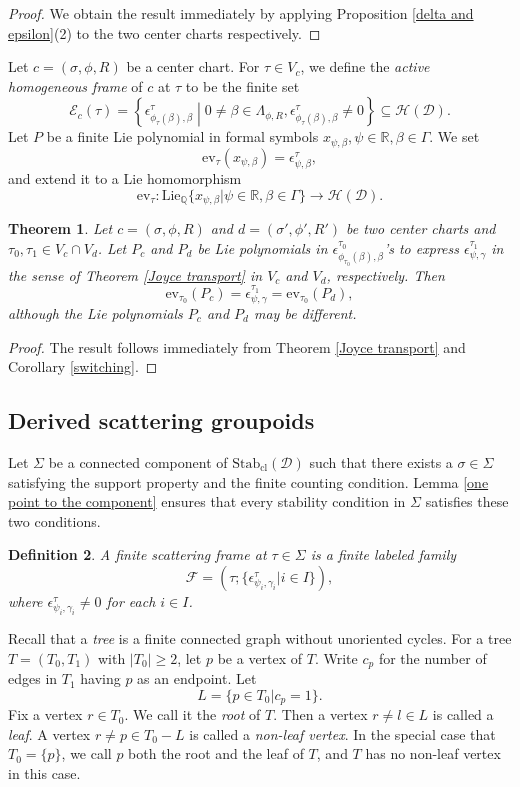 \documentclass[a4paper,12pt]{amsart}
\numberwithin{equation}{section}
\newtheorem{theorem}{Theorem}[section]
\newtheorem{definition}[theorem]{Definition}
\newcommand{\Stab}{\mathrm{Stab}}
\newcommand{\cl}{\mathrm{cl}}
\newcommand{\1}{\mathbf{1}}
\newcommand{\ev}{\mathrm{ev}}
\newcommand{\Lie}{\mathrm{Lie}}
\begin{document}
\begin{proof}
    We obtain the result immediately by applying Proposition \ref{delta and epsilon}(2) to the two center charts respectively.
\end{proof}
Let $c=(\sigma,\phi,R)$ be a center chart. For $\tau\in V_c$, we define the \emph{active homogeneous frame} of $c$ at $\tau$ to be the finite set
\[\mathscr{E}_c(\tau)=\left\{\epsilon^\tau_{\phi_\tau(\beta),\beta}\middle|0\neq\beta\in\Lambda_{\phi,R},\epsilon^\tau_{\phi_\tau(\beta),\beta}\neq0\right\}\subseteq\mathcal{H}(\mathcal{D}).\]
Let $P$ be a finite Lie polynomial in formal symbols $x_{\psi,\beta},\psi\in\mathbb{R},\beta\in\Gamma$. We set
\[\ev_\tau(x_{\psi,\beta})=\epsilon^\tau_{\psi,\beta},\]
and extend it to a Lie homomorphism
\[\ev_\tau:\Lie_{\mathbb{Q}}\{x_{\psi,\beta}|\psi\in\mathbb{R},\beta\in\Gamma\}\rightarrow\mathcal{H}(\mathcal{D}).\]


\begin{theorem}
    Let $c=(\sigma,\phi,R)$ and $d=(\sigma',\phi',R')$ be two center charts and $\tau_0,\tau_1\in V_c\cap V_d$. Let $P_c$ and $P_d$ be Lie polynomials in $\epsilon^{\tau_0}_{\phi_{\tau_0}(\beta),\beta}$'s to express $\epsilon^{\tau_1}_{\psi,\gamma}$ in the sense of Theorem \ref{Joyce transport} in $V_c$ and $V_d$, respectively. Then
    \[\ev_{\tau_0}(P_c)=\epsilon^{\tau_1}_{\psi,\gamma}=\ev_{\tau_0}(P_d),\]
    although the Lie polynomials $P_c$ and $P_d$ may be different.
\end{theorem}
\begin{proof}
    The result follows immediately from Theorem \ref{Joyce transport} and Corollary \ref{switching}.
\end{proof}
\subsection{Derived scattering groupoids}
Let $\Sigma$ be a connected component of $\Stab_\cl(\mathcal{D})$ such that there exists a $\sigma\in\Sigma$ satisfying the support property and the finite counting condition. Lemma \ref{one point to the component} ensures that every stability condition in $\Sigma$ satisfies these two conditions.
\begin{definition}
    A \emph{finite scattering frame} at $\tau\in\Sigma$ is a finite labeled family
    \[\mathscr{F}=\left(\tau;\{\epsilon^\tau_{\psi_i,\gamma_i}|i\in I\}\right),\]
    where $\epsilon^\tau_{\psi_i,\gamma_i}\neq0$ for each $i\in I$.
\end{definition}
Recall that a \emph{tree} is a finite connected graph without unoriented cycles. For a tree $T=(T_0,T
_1)$ with $|T_0|\geqslant2$, let $p$ be a vertex of $T$. Write $c_p$ for the number of edges in $T_1$ having $p$ as an endpoint. Let
\[L=\{p\in T_0|c_p=1\}.\]
Fix a vertex $r\in T_0$. We call it the \emph{root} of $T$. Then a vertex $r\neq l\in L$ is called a \emph{leaf}. A vertex $r\neq p\in T_0-L$ is called a \emph{non-leaf vertex}. In the special case that $T_0=\{p\}$, we call $p$ both the root and the leaf of $T$, and $T$ has no non-leaf vertex in this case.
\end{document}
